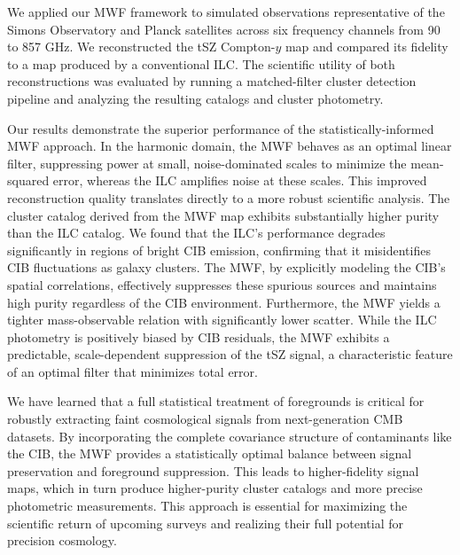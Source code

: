 \documentclass[]{article}
\begin{document}
We applied our MWF framework to simulated observations representative of the Simons Observatory and Planck satellites across six frequency channels from 90 to 857 GHz. We reconstructed the tSZ Compton-$y$ map and compared its fidelity to a map produced by a conventional ILC. The scientific utility of both reconstructions was evaluated by running a matched-filter cluster detection pipeline and analyzing the resulting catalogs and cluster photometry.

Our results demonstrate the superior performance of the statistically-informed MWF approach. In the harmonic domain, the MWF behaves as an optimal linear filter, suppressing power at small, noise-dominated scales to minimize the mean-squared error, whereas the ILC amplifies noise at these scales. This improved reconstruction quality translates directly to a more robust scientific analysis. The cluster catalog derived from the MWF map exhibits substantially higher purity than the ILC catalog. We found that the ILC's performance degrades significantly in regions of bright CIB emission, confirming that it misidentifies CIB fluctuations as galaxy clusters. The MWF, by explicitly modeling the CIB's spatial correlations, effectively suppresses these spurious sources and maintains high purity regardless of the CIB environment. Furthermore, the MWF yields a tighter mass-observable relation with significantly lower scatter. While the ILC photometry is positively biased by CIB residuals, the MWF exhibits a predictable, scale-dependent suppression of the tSZ signal, a characteristic feature of an optimal filter that minimizes total error.

We have learned that a full statistical treatment of foregrounds is critical for robustly extracting faint cosmological signals from next-generation CMB datasets. By incorporating the complete covariance structure of contaminants like the CIB, the MWF provides a statistically optimal balance between signal preservation and foreground suppression. This leads to higher-fidelity signal maps, which in turn produce higher-purity cluster catalogs and more precise photometric measurements. This approach is essential for maximizing the scientific return of upcoming surveys and realizing their full potential for precision cosmology.


{}

\end{document}
